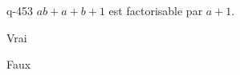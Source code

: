 \begin{truefalse}{q-453}
$ab+a+b+1$ est factorisable par $a+1$.
\item* Vrai
\item Faux
\end{truefalse}

